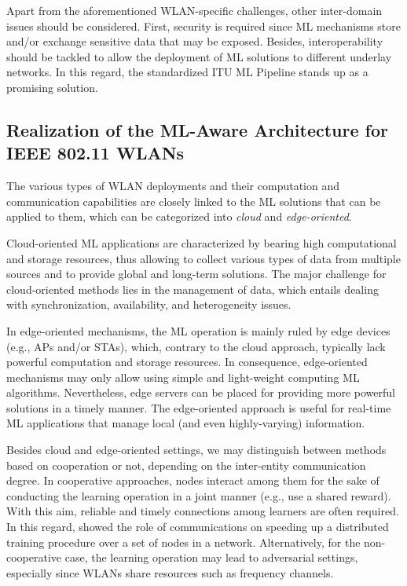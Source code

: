 \documentclass[twocolumn]{article}
\begin{document}
Apart from the aforementioned WLAN-specific challenges, other inter-domain issues should be considered. First, security is required since ML mechanisms store and/or exchange sensitive data that may be exposed. Besides, interoperability should be tackled to allow the deployment of ML solutions to different underlay networks. In this regard, the standardized ITU ML Pipeline stands up as a promising solution.

\subsection{Realization of the ML-Aware Architecture for IEEE 802.11 WLANs}
The various types of WLAN deployments and their computation and communication capabilities are closely linked to the ML solutions that can be applied to them, which can be categorized into \emph{cloud} and \emph{edge-oriented}. 

Cloud-oriented ML applications are characterized by
bearing high computational and storage resources, thus allowing to collect various types of data from multiple sources and to provide global and long-term solutions. The major challenge for cloud-oriented methods lies in the management of data, which entails dealing with synchronization, availability, and heterogeneity issues.

In edge-oriented mechanisms, the ML operation is mainly ruled by edge devices (e.g., APs and/or STAs), which, contrary to the cloud approach, typically lack powerful computation and storage resources. In consequence, edge-oriented mechanisms may only allow using simple and light-weight computing ML algorithms. Nevertheless, edge servers can be placed for providing more powerful solutions in a timely manner. The edge-oriented approach is useful for real-time ML applications that manage local (and even highly-varying) information.

Besides cloud and edge-oriented settings, we may distinguish between methods based on cooperation or not, depending on the inter-entity communication degree. In cooperative approaches, nodes interact among them for the sake of conducting the learning operation in a joint manner (e.g., use a shared reward). With this aim, reliable and timely connections among learners are often required. In this regard, \cite{lin2017deep} showed the role of communications on speeding up a distributed training procedure over a set of nodes in a network. Alternatively, for the non-cooperative case, the learning operation may lead to adversarial settings, especially since WLANs share resources such as frequency channels.
\end{document}
